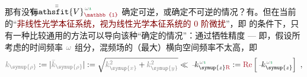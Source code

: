 那有没有 $\Xint{\mathcolor{gray}{-}}{25}{\bar{\bar{\mathsfit{V}}}}^{\;\! \mathcolor{gray}{\omega} \textcolor{ForestGreen}{\imath}}_{\textcolor{Maroon}{\mathbb{1}}}$ 确定可逆，或确定不可逆的情况？有。但在当前的“\textcolor{Maroon}{非线性光学本征系统，视为线性光学本征系统的 0 阶微扰}”，即  的条件下，只有一种比较通用的方法可以导向该种“确定的情况”：通过牺牲精度 --- 即，假设所考虑的时间频率 $\mathcolor{gray}{\omega}$ 组分，混频场的（最大）横向空间频率不太高，即
\begin{align} \label{eq:k_rho<<k_z}
	\mathcolor{gray}{k_{\symup{\rho}}} := \lvert \mathcolor{gray}{\bar{k}_{\symup{\rho}}} \rvert := \sqrt{ \mathcolor{gray}{k^2_{\symup{x}}} + \mathcolor{gray}{k^2_{\symup{y}}} } \ll \Xint{\begin{smallmatrix} ~ \\ {}^{}_{\mathcolor{gray}{-}} \\ ~ \end{smallmatrix}}{15}{k}_{\symup{z} \textcolor{Maroon}{\text{R}}}^{\;\! \mathcolor{gray}{\omega} \textcolor{ForestGreen}{\imath}} := \textcolor{Maroon}{\text{Re}} \left[ \Xint{\begin{smallmatrix} ~ \\ {}^{}_{\mathcolor{gray}{-}} \\ ~ \end{smallmatrix}}{15}{k}_{\symup{z}}^{\;\! \mathcolor{gray}{\omega} \textcolor{ForestGreen}{\imath}} \right] ~,
\end{align}
